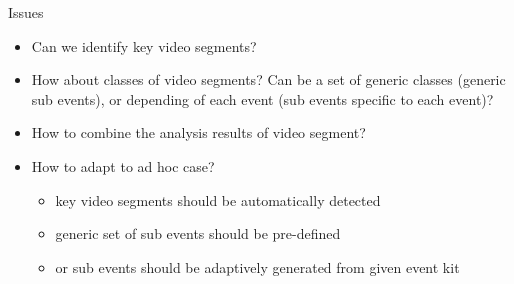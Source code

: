 \documentclass{beamer}
\begin{document}
\begin{frame}[t]{Issues}
\begin{itemize}
\item Can we identify key video segments? 
\item How about classes of video segments? Can be a set of generic classes (generic sub events), or depending of each event (sub events specific to each event)?
\item How to combine the analysis results of video segment?
\item How to adapt to ad hoc case?
\begin{itemize}
\item key video segments should be automatically detected
\item generic set of sub events should be pre-defined
\item or sub events should be adaptively generated from given event kit
\end{itemize}

\end{itemize}
\end{frame}
\end{document}
